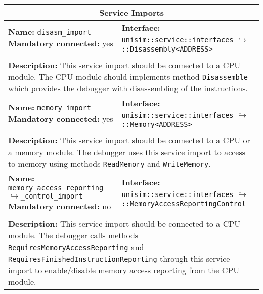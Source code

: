 \newpage
\begin{center}
	\begin{tabular}{|p{7.5cm}|p{7.5cm}|}
		\hline
		\multicolumn{2}{|c|}{\textbf{\large Service Imports}}\\
		\hline
		\multicolumn{1}{|p{7.5cm}}{\textbf{Name:} \texttt{disasm\_import} \newline \textbf{Mandatory connected:} yes} & \multicolumn{1}{p{7.5cm}|}{\textbf{Interface:} \newline \texttt{unisim::service::interfaces} \newline$\hookrightarrow$\texttt{::Disassembly<ADDRESS>}}\\
		\multicolumn{2}{|l|}{}\\
		\multicolumn{2}{|p{15cm}|}{\textbf{Description:} \newline This service import should be connected to a CPU module. The CPU module should implements method \texttt{Disassemble} which provides the debugger with disassembling of the instructions.}\\
		\hline
		\multicolumn{1}{|p{7.5cm}}{\textbf{Name:} \texttt{memory\_import} \newline \textbf{Mandatory connected:} yes} & \multicolumn{1}{p{7.5cm}|}{\textbf{Interface:} \newline \texttt{unisim::service::interfaces} \newline$\hookrightarrow$\texttt{::Memory<ADDRESS>}}\\
		\multicolumn{2}{|l|}{}\\
		\multicolumn{2}{|p{15cm}|}{\textbf{Description:} \newline This service import should be connected to a CPU or a memory module. The debugger uses this service import to access to memory using methods \texttt{ReadMemory} and \texttt{WriteMemory}.}\\
		\hline
		\multicolumn{1}{|p{7.5cm}}{\textbf{Name:} \texttt{memory\_access\_reporting\newline$\hookrightarrow$\_control\_import} \newline \textbf{Mandatory connected:} no} & \multicolumn{1}{p{7.5cm}|}{\textbf{Interface:} \newline \texttt{unisim::service::interfaces} \newline$\hookrightarrow$\texttt{::MemoryAccessReportingControl}}\\
		\multicolumn{2}{|l|}{}\\
		\multicolumn{2}{|p{15cm}|}{\textbf{Description:} \newline This service import should be connected to a CPU module. The debugger calls methods \texttt{RequiresMemoryAccessReporting} and \texttt{RequiresFinishedInstructionReporting} through this service import to enable/disable memory access reporting from the CPU module.}\\

\end{tabular}
\end{center}
